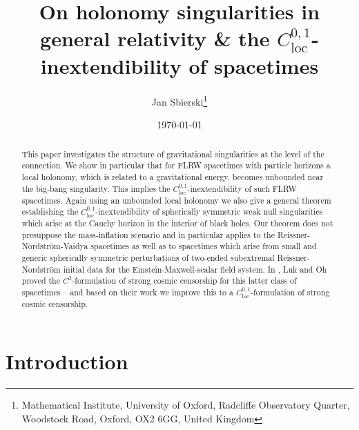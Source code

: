 \documentclass[reqno]{article}
\newcommand{\loc}{\mathrm{loc}}
\begin{document}
\newtheorem{theorem}[equation]{Theorem}
\newtheorem{remark}[equation]{Remark}
\newtheorem{assumption}[equation]{Assumption}
\newtheorem{claim}[equation]{Claim}
\newtheorem{lemma}[equation]{Lemma}
\newtheorem{definition}[equation]{Definition}
\newtheorem{corollary}[equation]{Corollary}
\newtheorem{proposition}[equation]{Proposition}
\newtheorem*{theorem*}{Theorem}
\newtheorem{conjecture}[equation]{Conjecture}
\newtheorem{example}[equation]{Example}

\setcounter{tocdepth}{3}

\title{On holonomy singularities in general relativity \& the $C^{0,1}_{\mathrm{loc}}$-inextendibility of spacetimes}
\author{Jan Sbierski\thanks{Mathematical Institute, 
University of Oxford,
Radcliffe Observatory Quarter,
Woodstock Road, 
Oxford, 
OX2 6GG,
United Kingdom}}
\date{\today}

\maketitle

\begin{abstract}
This paper investigates the structure of gravitational singularities at the level of the connection. We show in particular that for FLRW spacetimes with particle horizons a local holonomy, which is related to a gravitational energy, becomes unbounded near the big-bang singularity. This implies the $C^{0,1}_{\loc}$-inextendibility of such FLRW spacetimes.
Again using an unbounded local holonomy we also give a general theorem establishing the $C^{0,1}_{\loc}$-inextendibility of spherically symmetric weak null singularities which arise at the Cauchy horizon in the interior of black holes. Our theorem does not presuppose the mass-inflation scenario and in particular applies to the Reissner-Nordstr\"om-Vaidya spacetimes as well as to spacetimes which arise from small and generic spherically symmetric perturbations of two-ended subextremal Reissner-Nordstr\"om initial data for the Einstein-Maxwell-scalar field system. In \cite{LukOh19I}, \cite{LukOh19II} Luk and Oh proved the $C^2$-formulation of strong cosmic censorship for this latter class of spacetimes -- and based on their work we improve this to a $C^{0,1}_{\loc}$-formulation of strong cosmic censorship.
\end{abstract}

\tableofcontents




\section{Introduction}
\end{document}
